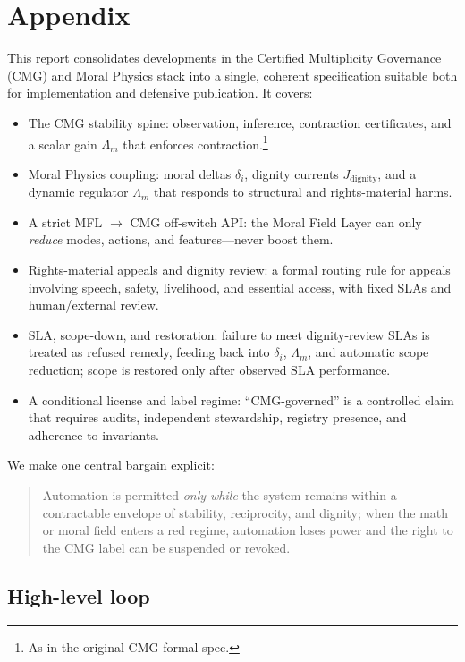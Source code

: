 \documentclass[11pt]{article}
\begin{document}
\newpage
\appendix
\section{Appendix}
\label{app:math}


This report consolidates developments in the Certified Multiplicity Governance (CMG) and Moral Physics stack into a single, coherent specification suitable both for implementation and defensive publication.
It covers:

\begin{itemize}
  \item The CMG stability spine: observation, inference, contraction certificates, and a scalar gain \(\Lambda_m\) that enforces contraction.\footnote{As in the original CMG formal spec.}
  \item Moral Physics coupling: moral deltas \(\delta_i\), dignity currents \(J_{\text{dignity}}\), and a dynamic regulator \(\Lambda_m\) that responds to structural and rights-material harms.
  \item A strict MFL \(\rightarrow\) CMG off-switch API: the Moral Field Layer can only \emph{reduce} modes, actions, and features---never boost them.
  \item Rights-material appeals and dignity review: a formal routing rule for appeals involving speech, safety, livelihood, and essential access, with fixed SLAs and human/external review.
  \item SLA, scope-down, and restoration: failure to meet dignity-review SLAs is treated as refused remedy, feeding back into \(\delta_i\), \(\Lambda_m\), and automatic scope reduction; scope is restored only after observed SLA performance.
  \item A conditional license and label regime: ``CMG-governed'' is a controlled claim that requires audits, independent stewardship, registry presence, and adherence to invariants.
\end{itemize}

We make one central bargain explicit:

\begin{quote}
Automation is permitted \emph{only while} the system remains within a contractable envelope of stability, reciprocity, and dignity; when the math or moral field enters a red regime, automation loses power and the right to the CMG label can be suspended or revoked.
\end{quote}

\subsection{High-level loop}
\end{document}
